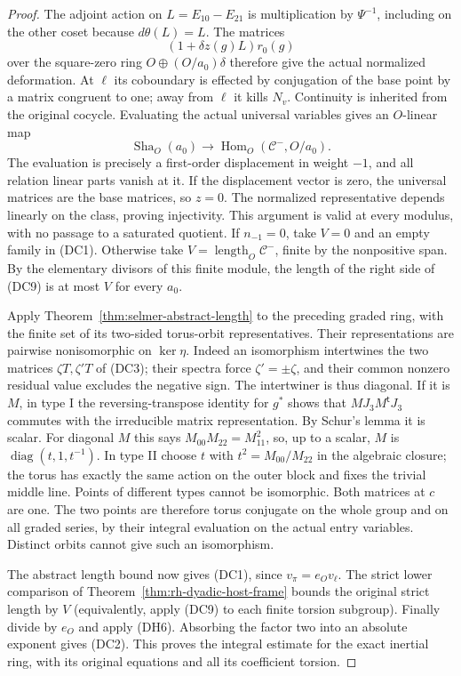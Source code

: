 \begin{proof}
The adjoint action on $L=E_{10}-E_{21}$ is multiplication by
$\Psi^{-1}$, including on the other coset because
$d\theta(L)=L$. The matrices
\[
                     (1+\delta z(g)L)r_0(g)
\]
over the square-zero ring $O\oplus (O/a_0)\delta$ therefore
give the actual normalized deformation. At $\ell$ its
coboundary is effected by conjugation of the base point by a
matrix congruent to one; away from $\ell$ it kills $N_v$.
Continuity is inherited from the original cocycle.
Evaluating the actual universal variables gives an $O$-linear
map
\[
            \operatorname{Sha}_O(a_0)
                  \longrightarrow
                 \operatorname{Hom}_O(\mathcal C^-,O/a_0).      \tag{DC9}
\]
The evaluation is precisely a first-order displacement in
weight $-1$, and all relation linear parts vanish at it.
If the displacement vector is zero, the universal matrices
are the base matrices, so $z=0$. The normalized representative
depends linearly on the class, proving injectivity.
This argument is valid at every modulus, with no passage to
a saturated quotient. If $n_{-1}=0$, take $V=0$ and an empty
family in (DC1). Otherwise take
$V=\operatorname{length}_O\mathcal C^-$, finite by the
nonpositive span. By the elementary divisors of this finite
module, the length of the right side of (DC9) is at most $V$
for every $a_0$.

Apply Theorem~\ref{thm:selmer-abstract-length} to the preceding
graded ring, with the finite set of its two-sided torus-orbit
representatives. Their representations are pairwise
nonisomorphic on $\ker\eta$. Indeed an isomorphism intertwines
the two matrices $\zeta T,\zeta'T$ of (DC3); their spectra
force $\zeta'=\pm\zeta$, and their common nonzero residual
value excludes the negative sign. The intertwiner is thus
diagonal. If it is $M$, in type I the reversing-transpose identity
for $g^*$ shows that $M J_3M^{\mathsf t}J_3$ commutes with
the irreducible matrix representation. By Schur's lemma it
is scalar. For diagonal $M$ this says
$M_{00}M_{22}=M_{11}^2$, so, up to a scalar, $M$ is
$\operatorname{diag}(t,1,t^{-1})$.
In type II choose $t$ with $t^2=M_{00}/M_{22}$ in the
algebraic closure; the torus has exactly the same action
on the outer block and fixes the trivial middle line.
Points of different types cannot be isomorphic.
Both matrices at $c$ are one. The two points are therefore torus conjugate on the
whole group and on all graded series, by their integral
evaluation on the actual entry variables. Distinct orbits
cannot give such an isomorphism.

The abstract length bound now gives (DC1), since
$v_\pi=e_Ov_\ell$. The strict lower comparison of
Theorem~\ref{thm:rh-dyadic-host-frame} bounds the original
strict length by $V$ (equivalently, apply (DC9) to each finite
torsion subgroup). Finally divide by $e_O$ and apply (DH6).
Absorbing the factor two into an absolute exponent gives
(DC2). This proves the integral estimate for the exact
inertial ring, with its original equations and all its
coefficient torsion.
\end{proof}

